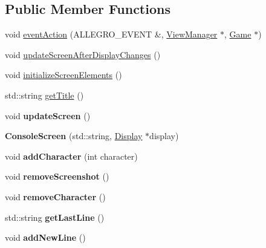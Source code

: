\subsection*{Public Member Functions}
\begin{DoxyCompactItemize}
\item 
void \hyperlink{classConsoleScreen_a6db8562435775c00363479c303d884a5}{event\+Action} (A\+L\+L\+E\+G\+R\+O\+\_\+\+E\+V\+E\+NT \&, \hyperlink{classViewManager}{View\+Manager} $\ast$, \hyperlink{classGame}{Game} $\ast$)
\item 
void \hyperlink{classConsoleScreen_a512a1401ec957d5d2d504aafd315362d}{update\+Screen\+After\+Display\+Changes} ()
\item 
void \hyperlink{classConsoleScreen_a632e8a9ebefb9574537d5268e6ae805f}{initialize\+Screen\+Elements} ()
\item 
std\+::string \hyperlink{classConsoleScreen_a826d101fdea392e61d6d4f5b1087a33f}{get\+Title} ()
\item 
void {\bfseries update\+Screen} ()\hypertarget{classConsoleScreen_a0439f4f690a398f43952a6dffb7b2b20}{}\label{classConsoleScreen_a0439f4f690a398f43952a6dffb7b2b20}

\item 
{\bfseries Console\+Screen} (std\+::string, \hyperlink{classDisplay}{Display} $\ast$display)\hypertarget{classConsoleScreen_a01b953aaa725a0b844d530b0f6d042bf}{}\label{classConsoleScreen_a01b953aaa725a0b844d530b0f6d042bf}

\item 
void {\bfseries add\+Character} (int character)\hypertarget{classConsoleScreen_a53358e8bf5f4dbacd719e993644335c8}{}\label{classConsoleScreen_a53358e8bf5f4dbacd719e993644335c8}

\item 
void {\bfseries remove\+Screenshot} ()\hypertarget{classConsoleScreen_afc261c0c2a8945de896c46e314f8988c}{}\label{classConsoleScreen_afc261c0c2a8945de896c46e314f8988c}

\item 
void {\bfseries remove\+Character} ()\hypertarget{classConsoleScreen_a3030f2a5ba1a99cf3c1bcdd1db06b943}{}\label{classConsoleScreen_a3030f2a5ba1a99cf3c1bcdd1db06b943}

\item 
std\+::string {\bfseries get\+Last\+Line} ()\hypertarget{classConsoleScreen_a70051b4511a76d81ba6483128a6d9658}{}\label{classConsoleScreen_a70051b4511a76d81ba6483128a6d9658}

\item 
void {\bfseries add\+New\+Line} ()\hypertarget{classConsoleScreen_a69265f0111b9fd6c0f0e65fbe0f70771}{}\label{classConsoleScreen_a69265f0111b9fd6c0f0e65fbe0f70771}


\end{DoxyCompactItemize}
